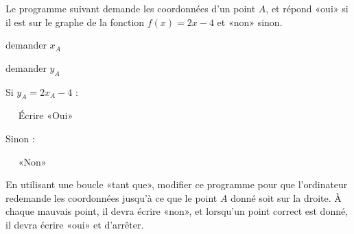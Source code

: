 
\begin{exercice}[\ldots/3]\label{exosmath-0707}

    Le programme suivant demande les coordonnées d'un point \( A\), et répond «oui» si il est sur le graphe de la fonction \( f(x)=2x-4\) et «non» sinon.

    \begin{fmpage}{0.9\linewidth}

        demander \( x_A\)

        demander \( y_A\)

        Si \(  y_A=2x_A-4 \) :

        ~~ Écrire «Oui» 

        Sinon :

        ~~ «Non» 

    \end{fmpage}

    En utilisant une boucle «tant que», modifier ce programme pour que l'ordinateur redemande les coordonnées jusqu'à ce que le point \( A\) donné soit sur la droite. À chaque mauvais point, il devra écrire «non», et lorsqu'un point correct est donné, il devra écrire «oui» et d'arrêter.

\end{exercice}
